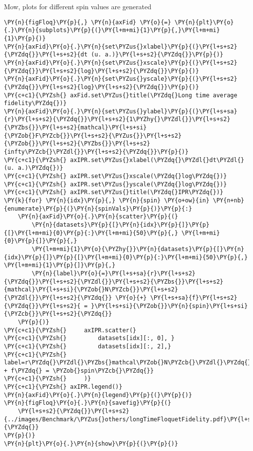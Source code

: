     Mow, plots for different spin values are generated

    \begin{tcolorbox}[breakable, size=fbox, boxrule=1pt, pad at break*=1mm,colback=cellbackground, colframe=cellborder]
\begin{Verbatim}[commandchars=\\\{\}]
\PY{n}{figFloq}\PY{p}{,} \PY{n}{axFid} \PY{o}{=} \PY{n}{plt}\PY{o}{.}\PY{n}{subplots}\PY{p}{(}\PY{l+m+mi}{1}\PY{p}{,}\PY{l+m+mi}{1}\PY{p}{)}
\PY{n}{axFid}\PY{o}{.}\PY{n}{set\PYZus{}xlabel}\PY{p}{(}\PY{l+s+s2}{\PYZdq{}}\PY{l+s+s2}{dt (u. a.)}\PY{l+s+s2}{\PYZdq{}}\PY{p}{)}
\PY{n}{axFid}\PY{o}{.}\PY{n}{set\PYZus{}xscale}\PY{p}{(}\PY{l+s+s2}{\PYZdq{}}\PY{l+s+s2}{log}\PY{l+s+s2}{\PYZdq{}}\PY{p}{)}
\PY{n}{axFid}\PY{o}{.}\PY{n}{set\PYZus{}yscale}\PY{p}{(}\PY{l+s+s2}{\PYZdq{}}\PY{l+s+s2}{log}\PY{l+s+s2}{\PYZdq{}}\PY{p}{)}
\PY{c+c1}{\PYZsh{} axFid.set\PYZus{}title(\PYZdq{}Long time average fidelity\PYZdq{})}
\PY{n}{axFid}\PY{o}{.}\PY{n}{set\PYZus{}ylabel}\PY{p}{(}\PY{l+s+sa}{r}\PY{l+s+s2}{\PYZdq{}}\PY{l+s+s2}{1\PYZhy{}\PYZdl{}}\PY{l+s+s2}{\PYZbs{}}\PY{l+s+s2}{mathcal}\PY{l+s+si}{\PYZob{}F\PYZcb{}}\PY{l+s+s2}{\PYZus{}}\PY{l+s+s2}{\PYZob{}}\PY{l+s+s2}{\PYZbs{}}\PY{l+s+s2}{infty\PYZcb{}\PYZdl{}}\PY{l+s+s2}{\PYZdq{}}\PY{p}{)}
\PY{c+c1}{\PYZsh{} axIPR.set\PYZus{}xlabel(\PYZdq{}\PYZdl{}dt\PYZdl{} (u. a.)\PYZdq{})}
\PY{c+c1}{\PYZsh{} axIPR.set\PYZus{}xscale(\PYZdq{}log\PYZdq{})}
\PY{c+c1}{\PYZsh{} axIPR.set\PYZus{}yscale(\PYZdq{}log\PYZdq{})}
\PY{c+c1}{\PYZsh{} axIPR.set\PYZus{}title(\PYZdq{}IPR\PYZdq{})}
\PY{k}{for} \PY{n}{idx}\PY{p}{,} \PY{n}{spin} \PY{o+ow}{in} \PY{n+nb}{enumerate}\PY{p}{(}\PY{n}{spinVals}\PY{p}{)}\PY{p}{:}
    \PY{n}{axFid}\PY{o}{.}\PY{n}{scatter}\PY{p}{(}
        \PY{n}{datasets}\PY{p}{[}\PY{n}{idx}\PY{p}{]}\PY{p}{[}\PY{l+m+mi}{0}\PY{p}{:}\PY{l+m+mi}{50}\PY{p}{,} \PY{l+m+mi}{0}\PY{p}{]}\PY{p}{,} 
        \PY{l+m+mi}{1}\PY{o}{\PYZhy{}}\PY{n}{datasets}\PY{p}{[}\PY{n}{idx}\PY{p}{]}\PY{p}{[}\PY{l+m+mi}{0}\PY{p}{:}\PY{l+m+mi}{50}\PY{p}{,} \PY{l+m+mi}{1}\PY{p}{]}\PY{p}{,} 
        \PY{n}{label}\PY{o}{=}\PY{l+s+sa}{r}\PY{l+s+s2}{\PYZdq{}}\PY{l+s+s2}{\PYZdl{}}\PY{l+s+s2}{\PYZbs{}}\PY{l+s+s2}{mathcal}\PY{l+s+si}{\PYZob{}N\PYZcb{}}\PY{l+s+s2}{\PYZdl{}}\PY{l+s+s2}{\PYZdq{}} \PY{o}{+} \PY{l+s+sa}{f}\PY{l+s+s2}{\PYZdq{}}\PY{l+s+s2}{ = }\PY{l+s+si}{\PYZob{}}\PY{n}{spin}\PY{l+s+si}{\PYZcb{}}\PY{l+s+s2}{\PYZdq{}}
    \PY{p}{)}
\PY{c+c1}{\PYZsh{}     axIPR.scatter(}
\PY{c+c1}{\PYZsh{}         datasets[idx][:, 0], }
\PY{c+c1}{\PYZsh{}         datasets[idx][:, 2],}
\PY{c+c1}{\PYZsh{}         label=r\PYZdq{}\PYZdl{}\PYZbs{}mathcal\PYZob{}N\PYZcb{}\PYZdl{}\PYZdq{} + f\PYZdq{} = \PYZob{}spin\PYZcb{}\PYZdq{}}
\PY{c+c1}{\PYZsh{}     )}
\PY{c+c1}{\PYZsh{} axIPR.legend()}
\PY{n}{axFid}\PY{o}{.}\PY{n}{legend}\PY{p}{(}\PY{p}{)}
\PY{n}{figFloq}\PY{o}{.}\PY{n}{savefig}\PY{p}{(}
    \PY{l+s+s2}{\PYZdq{}}\PY{l+s+s2}{../images/Benchmark/\PYZus{}others/longTimeFloquetFidelity.pdf}\PY{l+s+s2}{\PYZdq{}}
\PY{p}{)}
\PY{n}{plt}\PY{o}{.}\PY{n}{show}\PY{p}{(}\PY{p}{)}
\end{Verbatim}
\end{tcolorbox}

